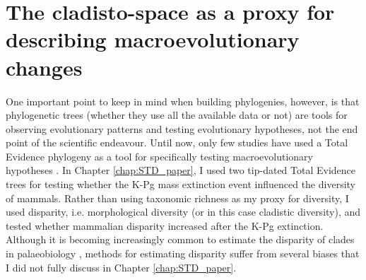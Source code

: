 

\section{The cladisto-space as a proxy for describing macroevolutionary changes} 
One important point to keep in mind when building phylogenies, however, is that phylogenetic trees (whether they use all the available data or not) are tools for observing evolutionary patterns and testing evolutionary hypotheses, not the end point of the scientific endeavour.
Until now, only few studies have used a Total Evidence phylogeny as a tool for specifically testing macroevolutionary hypotheses \citep[e.g.][]{Slater2012MEE,Wood01032013,Dembo2015}.
In Chapter \ref{chap:STD_paper}, I used two tip-dated Total Evidence trees for testing whether the K-Pg mass extinction event influenced the diversity of mammals.
Rather than using taxonomic richness as my proxy for diversity, I used disparity, i.e. morphological diversity (or in this case cladistic diversity), and tested whether mammalian disparity increased after the K-Pg extinction.
Although it is becoming increasingly common to estimate the disparity of clades in palaeobiology \citep[e.g.][]{Butler2012,brusattedinosaur2012,toljagictriassic-jurassic2013,brusattegradual2014,bensonfaunal2014,Claddis,Close2015}, methods for estimating disparity suffer from several biases that I did not fully discuss in Chapter \ref{chap:STD_paper}.

